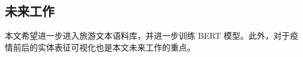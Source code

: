 \documentclass[bwprint]{gmcmthesis}
\begin{document}
\subsection{未来工作}

本文希望进一步进入旅游文本语料库，并进一步训练 BERT 模型。此外，对于疫情前后的实体表征可视化也是本文未来工作的重点。









\end{document}
